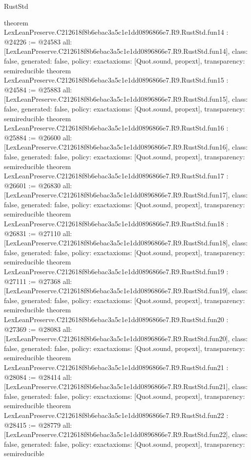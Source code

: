 \begin{lexlean}{RustStd}
\begin{coremodule}
{}
theorem LexLeanPreserve.C212618f8b6ebac3a5c1e1dd0896866e7.R9.RustStd.fun14 : @24226 := @24583 {
  all: [LexLeanPreserve.C212618f8b6ebac3a5c1e1dd0896866e7.R9.RustStd.fun14],
  class: false,
  generated: false,
  policy: exact{axioms: [Quot.sound, propext]},
  transparency: semireducible
}
theorem LexLeanPreserve.C212618f8b6ebac3a5c1e1dd0896866e7.R9.RustStd.fun15 : @24584 := @25883 {
  all: [LexLeanPreserve.C212618f8b6ebac3a5c1e1dd0896866e7.R9.RustStd.fun15],
  class: false,
  generated: false,
  policy: exact{axioms: [Quot.sound, propext]},
  transparency: semireducible
}
theorem LexLeanPreserve.C212618f8b6ebac3a5c1e1dd0896866e7.R9.RustStd.fun16 : @25884 := @26600 {
  all: [LexLeanPreserve.C212618f8b6ebac3a5c1e1dd0896866e7.R9.RustStd.fun16],
  class: false,
  generated: false,
  policy: exact{axioms: [Quot.sound, propext]},
  transparency: semireducible
}
theorem LexLeanPreserve.C212618f8b6ebac3a5c1e1dd0896866e7.R9.RustStd.fun17 : @26601 := @26830 {
  all: [LexLeanPreserve.C212618f8b6ebac3a5c1e1dd0896866e7.R9.RustStd.fun17],
  class: false,
  generated: false,
  policy: exact{axioms: [Quot.sound, propext]},
  transparency: semireducible
}
theorem LexLeanPreserve.C212618f8b6ebac3a5c1e1dd0896866e7.R9.RustStd.fun18 : @26831 := @27110 {
  all: [LexLeanPreserve.C212618f8b6ebac3a5c1e1dd0896866e7.R9.RustStd.fun18],
  class: false,
  generated: false,
  policy: exact{axioms: [Quot.sound, propext]},
  transparency: semireducible
}
theorem LexLeanPreserve.C212618f8b6ebac3a5c1e1dd0896866e7.R9.RustStd.fun19 : @27111 := @27368 {
  all: [LexLeanPreserve.C212618f8b6ebac3a5c1e1dd0896866e7.R9.RustStd.fun19],
  class: false,
  generated: false,
  policy: exact{axioms: [Quot.sound, propext]},
  transparency: semireducible
}
theorem LexLeanPreserve.C212618f8b6ebac3a5c1e1dd0896866e7.R9.RustStd.fun20 : @27369 := @28083 {
  all: [LexLeanPreserve.C212618f8b6ebac3a5c1e1dd0896866e7.R9.RustStd.fun20],
  class: false,
  generated: false,
  policy: exact{axioms: [Quot.sound, propext]},
  transparency: semireducible
}
theorem LexLeanPreserve.C212618f8b6ebac3a5c1e1dd0896866e7.R9.RustStd.fun21 : @28084 := @28414 {
  all: [LexLeanPreserve.C212618f8b6ebac3a5c1e1dd0896866e7.R9.RustStd.fun21],
  class: false,
  generated: false,
  policy: exact{axioms: [Quot.sound, propext]},
  transparency: semireducible
}
theorem LexLeanPreserve.C212618f8b6ebac3a5c1e1dd0896866e7.R9.RustStd.fun22 : @28415 := @28779 {
  all: [LexLeanPreserve.C212618f8b6ebac3a5c1e1dd0896866e7.R9.RustStd.fun22],
  class: false,
  generated: false,
  policy: exact{axioms: [Quot.sound, propext]},
  transparency: semireducible
}
\end{coremodule}
\end{lexlean}
